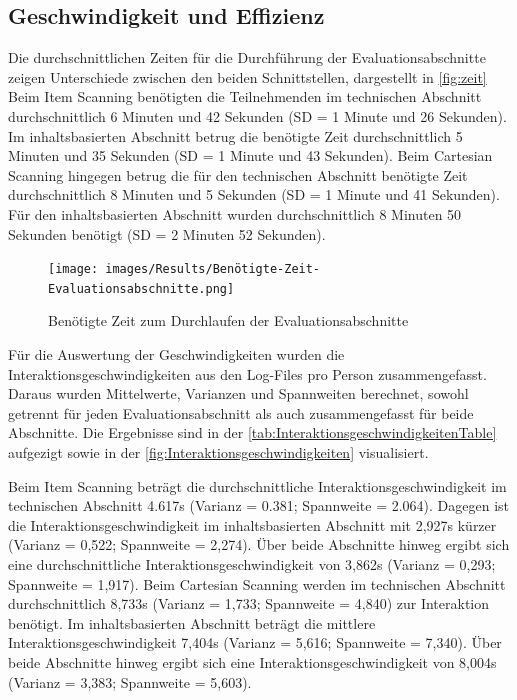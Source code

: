 \subsection{Geschwindigkeit und Effizienz}

Die durchschnittlichen Zeiten für die Durchführung der Evaluationsabschnitte zeigen Unterschiede zwischen den beiden Schnittstellen, dargestellt in \autoref{fig:zeit} Beim Item Scanning benötigten die Teilnehmenden im technischen Abschnitt durchschnittlich 6 Minuten und 42 Sekunden (SD = 1 Minute und 26 Sekunden). Im inhaltsbasierten Abschnitt betrug die benötigte Zeit durchschnittlich 5 Minuten und 35 Sekunden (SD = 1 Minute und 43 Sekunden).
Beim Cartesian Scanning hingegen betrug die für den technischen Abschnitt benötigte Zeit durchschnittlich 8 Minuten und 5 Sekunden (SD = 1 Minute und 41 Sekunden). Für den inhaltsbasierten Abschnitt wurden durchschnittlich 8 Minuten 50 Sekunden benötigt (SD = 2 Minuten 52 Sekunden).

\begin{figure}[tbh]
    \centering
    \texttt{[image: images/Results/Benötigte-Zeit-Evaluationsabschnitte.png]}
    \caption{Benötigte Zeit zum Durchlaufen der Evaluationsabschnitte}
    \label{fig:zeit}
\end{figure}

Für die Auswertung der Geschwindigkeiten wurden die Interaktionsgeschwindigkeiten aus den Log-Files pro Person zusammengefasst. Daraus wurden Mittelwerte, Varianzen und Spannweiten berechnet, sowohl getrennt für jeden Evaluationsabschnitt als auch zusammengefasst für beide Abschnitte. Die Ergebnisse sind in der \autoref{tab:InteraktionsgeschwindigkeitenTable} aufgezigt sowie in der \autoref{fig:Interaktionsgeschwindigkeiten} visualisiert. 

Beim Item Scanning beträgt die durchschnittliche Interaktionsgeschwindigkeit im technischen Abschnitt 4.617s (Varianz = 0.381; Spannweite = 2.064). Dagegen ist die Interaktionsgeschwindigkeit im inhaltsbasierten Abschnitt mit 2,927s kürzer (Varianz = 0,522; Spannweite = 2,274). Über beide Abschnitte hinweg ergibt sich eine durchschnittliche Interaktionsgeschwindigkeit von 3,862s (Varianz = 0,293; Spannweite = 1,917).
Beim Cartesian Scanning werden im technischen Abschnitt durchschnittlich 8,733s (Varianz = 1,733; Spannweite = 4,840) zur Interaktion benötigt. Im inhaltsbasierten Abschnitt beträgt die mittlere Interaktionsgeschwindigkeit 7,404s (Varianz = 5,616; Spannweite = 7,340). Über beide Abschnitte hinweg ergibt sich eine Interaktionsgeschwindigkeit von 8,004s (Varianz = 3,383; Spannweite = 5,603).

